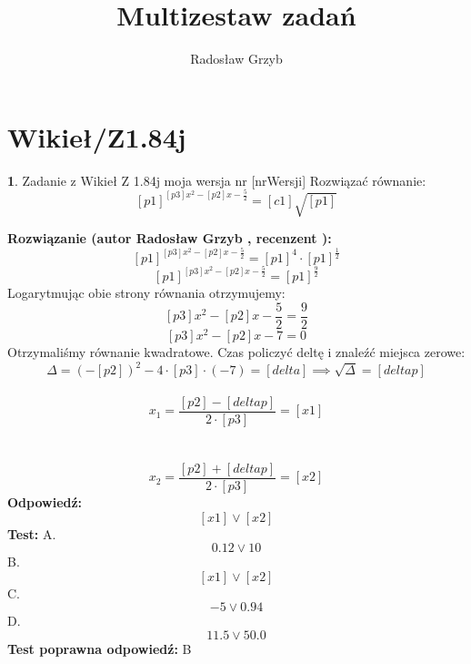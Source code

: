 \documentclass[12pt, a4paper]{article}
\title{Multizestaw zadań}
\author{Radosław Grzyb}
\date{}
\theoremstyle{definition} %
\newtheorem{zad}{}
\newcommand{\kategoria}[1]{\section{#1}} %
\newcommand{\zadStart}[1]{\begin{zad}#1\newline} %
\newcommand{\zadStop}{\end{zad}}   %
\newcommand{\rozwStart}[2]{\noindent \textbf{Rozwiązanie (autor #1 , recenzent #2): }\newline} %
\newcommand{\rozwStop}{\newline}                                            %
\newcommand{\odpStart}{\noindent \textbf{Odpowiedź:}\newline}    %
\newcommand{\odpStop}{\newline}                                             %
\newcommand{\testStart}{\noindent \textbf{Test:}\newline} %
\newcommand{\testStop}{\newline} %
\newcommand{\kluczStart}{\noindent \textbf{Test poprawna odpowiedź:}\newline} %
\newcommand{\kluczStop}{\newline} %
\begin{document}
\maketitle
\kategoria{Wikieł/Z1.84j}
\zadStart{Zadanie z Wikieł Z 1.84j moja wersja nr [nrWersji]}
Rozwiązać równanie:
$$[p1]^{[p3]x^{2}-[p2]x-\frac{5}{2}}=[c1]\sqrt{[p1]}$$
\zadStop
\rozwStart{Radosław Grzyb}{}
$$[p1]^{[p3]x^{2}-[p2]x-\frac{5}{2}}=[p1]^{4}\cdot[p1]^{\frac{1}{2}}$$
$$[p1]^{[p3]x^{2}-[p2]x-\frac{5}{2}}=[p1]^{\frac{9}{2}}$$
Logarytmując obie strony równania otrzymujemy:
$$[p3]x^{2}-[p2]x-\frac{5}{2}=\frac{9}{2}$$
$$[p3]x^{2}-[p2]x-7=0$$
Otrzymaliśmy równanie kwadratowe. Czas policzyć deltę i znaleźć miejsca zerowe:
$$\Delta=(-[p2])^{2}-4\cdot[p3]\cdot(-7)=[delta]\implies \sqrt{\Delta}=[deltap]$$\\
$$x_{1}=\frac{[p2]-[deltap]}{2\cdot[p3]}=[x1]$$\\\\
$$x_{2}=\frac{[p2]+[deltap]}{2\cdot[p3]}=[x2]$$
\rozwStop
\odpStart
$$[x1] \vee [x2]$$
\odpStop
\testStart
A.$$0.12 \vee 10$$
B.$$[x1] \vee [x2]$$
C.$$-5 \vee 0.94$$
D.$$11.5 \vee 50.0$$
\testStop
\kluczStart
B
\kluczStop
\end{document}
